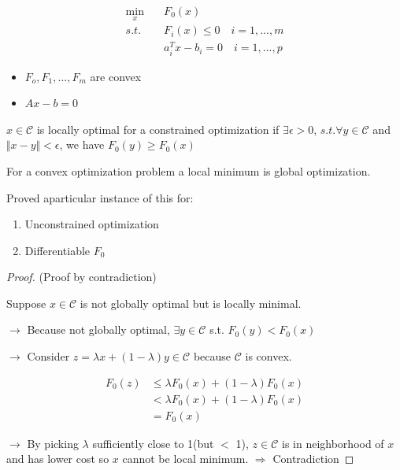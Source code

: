 


\begin{align*}
\min_x\quad & F_0(x) \\
s.t.\quad & F_i(x) \leq 0 \quad i = 1,...,m\\
& a_i^Tx - b_i = 0\quad i = 1,...,p
\end{align*}

\begin{itemize}
	\item $F_o, F_1,...,F_m$ are convex
	
	\item $Ax - b = 0$
\end{itemize}

\begin{definition}
	$x\in \mathcal{C}$ is locally optimal for a constrained optimization if $\exists \epsilon > 0$, $s.t.\forall y\in \mathcal{C}$ and $\Vert x-y\Vert < \epsilon$, we have $F_0(y) \geq F_0(x)$
\end{definition}

\begin{theorem}
	For a convex optimization problem a local minimum is global optimization. 
\end{theorem}
Proved aparticular instance of this for:
\begin{enumerate}
	\item Unconstrained optimization
	
	\item Differentiable $F_0$
\end{enumerate}

\begin{proof}
	(Proof by contradiction)
	
	Suppose $x\in \mathcal{C}$ is not globally optimal but is locally minimal.
	
	$\rightarrow$ Because not globally optimal, $\exists y\in \mathcal{C}$ s.t. $F_0(y)<F_0(x)$
	
	$\rightarrow$ Consider $z = \lambda x + (1-\lambda)y\in \mathcal{C}$ because $\mathcal{C}$ is convex.
	
	\begin{align*}
	F_0(z) &\leq \lambda F_0(x) + (1-\lambda)F_0(x)\\
	&< \lambda F_0(x) + (1-\lambda)F_0(x)\\
	&= F_0(x)
	\end{align*}
	
	$\rightarrow$ By picking $\lambda$ sufficiently close to 1(but $<$ 1), $z\in \mathcal{C}$ is in neighborhood of $x$ and has lower cost so $x$ cannot be local minimum. $\Rightarrow$ Contradiction
\end{proof}

